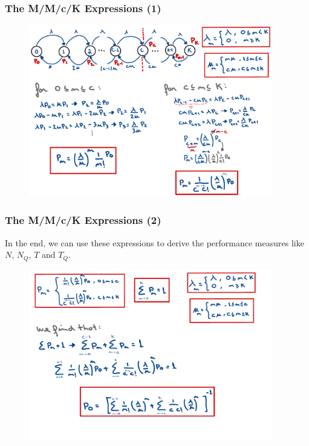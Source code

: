 \begin{frame}
    \frametitle{The M/M/c/K Expressions (1)}
    \begin{figure}
        \centering
        \includegraphics[width=0.95\textwidth]{slides/figures/mmck_equations_one.pdf}
    \end{figure}
\end{frame}


\begin{frame}
    \frametitle{The M/M/c/K Expressions (2)}
    In the end, we can use these expressions to derive the performance measures like $N$, $N_Q$, $T$ and $T_Q$.
    \begin{figure}
        \centering
        \includegraphics[width=0.95\textwidth]{slides/figures/mmck_equations_two.pdf}
    \end{figure}
\end{frame}



